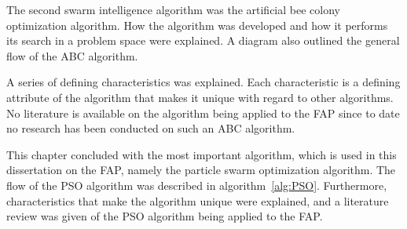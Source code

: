The second swarm intelligence algorithm was the artificial bee colony optimization algorithm. How the algorithm was developed and how it performs its search in a problem space were explained. A diagram also outlined the general flow of the \gls{ABC} algorithm.

A series of defining characteristics was explained. Each characteristic is a defining attribute of the algorithm that makes it unique with regard to other algorithms. No literature is available on the algorithm being applied to the \gls{FAP} since to date no research has been conducted on such an \gls{ABC} algorithm.

This chapter concluded with the most important algorithm, which is used in this dissertation on the \gls{FAP}, namely the particle swarm optimization algorithm. The flow of the \gls{PSO} algorithm was described in algorithm~\ref{alg:PSO}. Furthermore, characteristics that make the algorithm unique were explained, and a literature review was given of the \gls{PSO} algorithm being applied to the \gls{FAP}.
